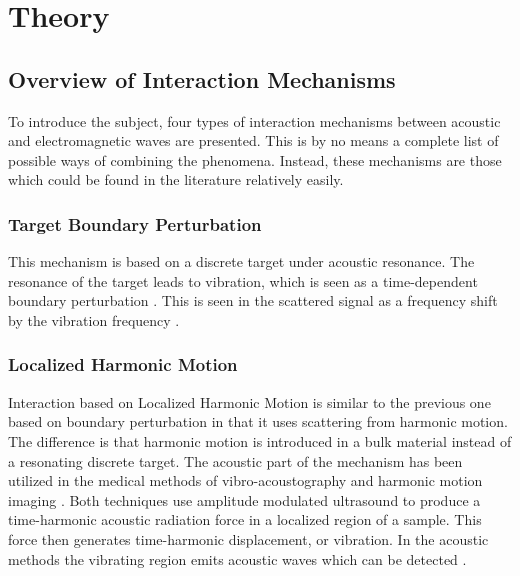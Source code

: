 \documentclass[11pt,twoside]{eitExjobb}
\begin{document}
	
	
	\chapter{Theory \label{ch:theory}}
	
	\section{Overview of Interaction Mechanisms}
	To introduce the subject, four types of interaction mechanisms between acoustic and electromagnetic waves are presented. This is by no means a complete list of possible ways of combining the phenomena. Instead, these mechanisms are those which could be found in the literature relatively easily.
	
	\subsection{Target Boundary Perturbation}
	This mechanism is based on a discrete target under acoustic resonance. The resonance of the target leads to vibration, which is seen as a time-dependent boundary perturbation \cite{Buerkle2007}. This is seen in the scattered signal as a frequency shift by the vibration frequency \cite{Sarabandi2003}.
	
	\subsection{Localized Harmonic Motion}
	Interaction based on Localized Harmonic Motion is similar to the previous one based on boundary perturbation in that it uses scattering from harmonic motion. The difference is that harmonic motion is introduced in a bulk material instead of a resonating discrete target. The acoustic part of the mechanism has been utilized in the medical methods of vibro-acoustography and harmonic motion imaging \cite{Wang2018}. Both techniques use amplitude modulated ultrasound to produce a time-harmonic acoustic radiation force in a localized region of a sample. This force then generates time-harmonic displacement, or vibration. In the acoustic methods the vibrating region emits acoustic waves which can be detected \cite{Fatemi1998}\cite{Konofagou2003}.
	
\end{document}

